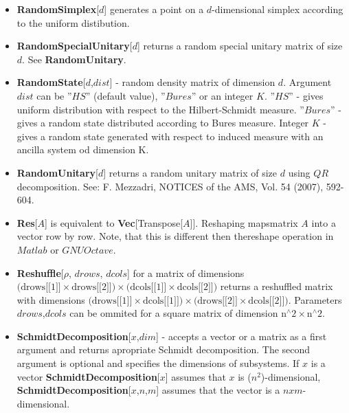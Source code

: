 \documentclass[a4paper,10pt]{scrartcl}
\begin{document}
\begin{itemize}
\item  \textbf{RandomSimplex}[$d$] generates a point on a $d$-dimensional simplex according to the uniform distibution.
\item  \textbf{RandomSpecialUnitary}[$d$] returns a random special unitary matrix of size $d$. See \textbf{RandomUnitary}.
\item  \textbf{RandomState}[$d$,$dist$] - random density matrix of dimension $d$. Argument $dist$ can be ''$HS$'' (default value), ''$Bures$'' or an integer $K$. \newline{}
\indent{} ''$HS$'' - gives uniform distribution with respect to the Hilbert-Schmidt measure. \newline{}
\indent{} ''$Bures$'' - gives a random state distributed according to Bures measure. \newline{}
\indent{} Integer $K$ - gives a random state generated with respect to induced measure with an ancilla system od dimension K.
\item  \textbf{RandomUnitary}[$d$] returns a random unitary matrix of size $d$ using $QR$ decomposition. See: F. Mezzadri,  NOTICES of the AMS, Vol. 54 (2007), 592-604.
\item  \textbf{Res}[$A$] is equivalent to \textbf{Vec}[Transpose[$A$]]. Reshaping mapsmatrix $A$ into a vector row by row. Note, that this is different then thereshape operation in $Matlab$ or $GNU Octave$.
\item  \textbf{Reshuffle}[$\rho$, {$drows$, $dcols$}] for a matrix of dimensions $\text{(drows[[1]]$\times $drows[[2]])$\times $(dcols[[1]]$\times $dcols[[2]])}$ returns a reshuffled matrix with dimensions $\text{(drows[[1]]$\times $dcols[[1]])$\times $(drows[[2]]$\times $dcols[[2]])}$.\newline{}
Parameters {$drows$,$dcols$} can be ommited for a square matrix of dimension $\text{n${}^{\wedge}$2$\times $n${}^{\wedge}$2}$.
\item  \textbf{SchmidtDecomposition}[$x$,$dim$] - accepts a vector or a matrix as a first argument and returns apropriate Schmidt decomposition. The second argument is optional and specifies the dimensions of subsystems.\newline{}
If $x$ is a vector\newline{}
\indent{} \textbf{SchmidtDecomposition}[$x$] assumes that $x$ is ($n^2$)-dimensional,\newline{}
\indent{} \textbf{SchmidtDecomposition}[$x$,{$n$,$m$}] assumes that the vector is a $n xm$-dimensional.\newline{}

\end{itemize}
\end{document}

